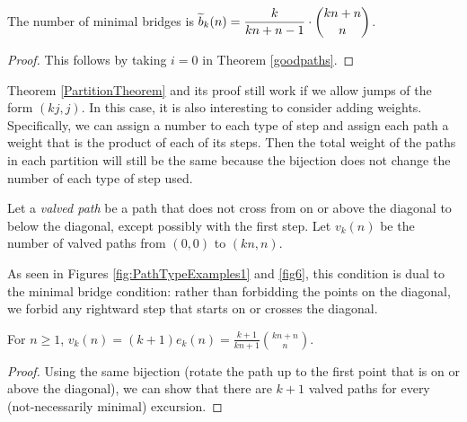 \documentclass[10pt]{article}
\begin{document}
\begin{corollary} \label{i0paths}
The number of minimal bridges is $\widetilde{b}_k(n) = \dfrac{k}{kn+n-1} \cdot \dbinom{kn+n}{n}$.
\end{corollary}
\begin{proof}
This follows by taking $i=0$ in Theorem \ref{goodpaths}.
\end{proof}

\begin{remark}
Theorem \ref{PartitionTheorem} and its proof still work if we allow jumps of the form $(kj,j)$.  In this case, it is also interesting to consider adding weights. Specifically, we can assign a number to each type of step and assign each path a weight that is the product of each of its steps. Then the total weight of the paths in each partition will still be the same because the bijection does not change the number of each type of step used. 
\end{remark}

\begin{definition}
\label{def:valve}
Let a \emph{valved path} be a path that does not cross from on or above the diagonal to below the diagonal, except possibly with the first step.  Let $v_k(n)$ be the number of valved paths from $(0,0)$ to $(kn,n)$.
\end{definition}
As seen in Figures \ref{fig:PathTypeExamples1} and \ref{fig6}, this condition is dual to the minimal bridge condition: rather than forbidding the points on the diagonal, we forbid any rightward step that starts on or crosses the diagonal.
\begin{proposition} \label{Prop:ValvedCount}
For $n \geq 1$, $\displaystyle v_k(n) = (k+1) e_k(n) = \frac{k+1}{kn+1}\binom{kn+n}{n}$.
\end{proposition}
\begin{proof}
Using the same bijection (rotate the path up to the first point that is on or above the diagonal), we can show that there are $k+1$ valved paths for every (not-necessarily minimal) excursion.
\end{proof}
\end{document}
